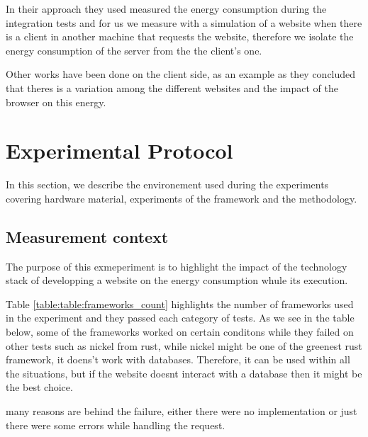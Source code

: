 In their approach they used measured the energy consumption during the integration tests and for us we measure with a simulation of a website when there is a client in another machine that requests the website, therefore we isolate the energy consumption of the server from the the client's one.


Other works have been done on the client side, as an example \cite{philippot_characterization_2014} as they concluded that theres is a variation among the different websites and the impact of the browser on this energy.


\newcommand\duration{20}
\newcommand\parallelclient{512}
\section{Experimental Protocol}

In this section, we describe the environement used during the experiments covering hardware material, experiments of the framework and the methodology.

\subsection{Measurement context}
The purpose of this exmeperiment is to highlight the impact of the technology stack of developping a website on the energy consumption whule its execution.

Table \ref{table:table:frameworks_count} highlights the number of frameworks used in the experiment and they passed each category of tests.
As we see in the table below, some of the frameworks worked on certain conditons while they failed on other tests such as nickel from rust, while nickel might be one of the greenest rust framework, it doens't work with databases. Therefore, it can be used within all the situations, but if the website doesnt interact with a database then it might be the best choice.

many reasons are behind the failure, either there were no implementation or just there were some errors while handling the request.




